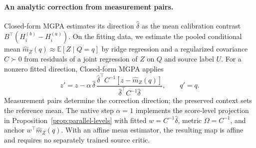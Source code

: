 \documentclass{article}
\theoremstyle{plain}
\theoremstyle{definition}
\newcommand{\E}{\mathbb E}
\begin{document}
\paragraph{An analytic correction from measurement pairs.}
\label{sec:mgpa-cf}
Closed-form MGPA estimates its direction $\widehat\delta$ as the mean
calibration contrast $B^\top(H_i^{(b)}-H_i^{(a)})$.
On the fitting data, we estimate the pooled
conditional mean $\widehat m_Z(q)\approx\E[Z\mid Q=q]$ by ridge regression
and a regularized covariance $C\succ0$ from residuals of a joint regression
of $Z$ on $Q$ and source label $U$. For a nonzero fitted direction,
Closed-form MGPA applies
\begin{equation}
 z'=z-\alpha\,\widehat\delta\,
 \frac{\widehat\delta^\top C^{-1}[z-\widehat m_Z(q)]}
 {\widehat\delta^\top C^{-1}\widehat\delta},\qquad q'=q.
 \label{eq:closed-form-mgpa}
\end{equation}
Measurement pairs determine the correction direction; the preserved context
sets the reference mean. The native step $\alpha=1$ implements the
score-level projection in Proposition~\ref{prop:parallel-levels} with fitted
$w=C^{-1}\widehat\delta$, metric $\Omega=C^{-1}$, and anchor
$w^\top\widehat m_Z(q)$. With an affine mean estimator, the resulting map is
affine and requires no separately trained source critic.
\end{document}
